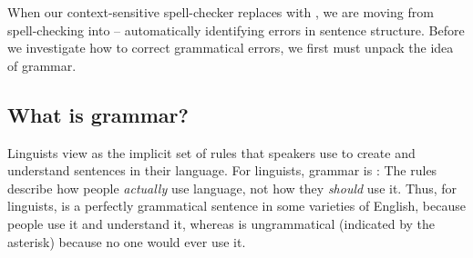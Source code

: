 When our context-sensitive spell-checker replaces  with , we are moving from spell-checking into  -- automatically identifying errors in sentence structure.  
Before we investigate how to correct grammatical errors, we first must unpack the idea of grammar.




\subsection{What is grammar?}
\label{sec:what-is-grammar}


 Linguists view  as the implicit set of rules that speakers use to create and understand sentences in their language.  For linguists, grammar is : The rules describe how people \emph{actually} use language, not how they \emph{should} use it.  Thus, for linguists,  is a perfectly grammatical sentence in some varieties of English, because people use it and understand it, whereas  is ungrammatical (indicated by the asterisk) because no one would ever use it.  

